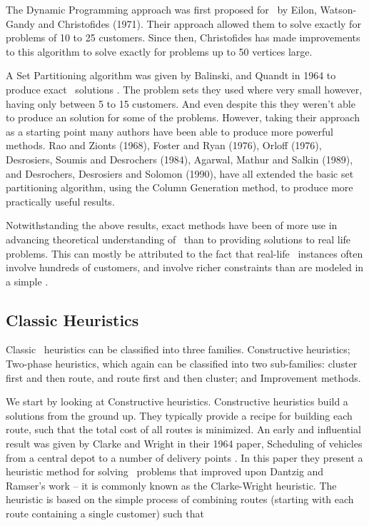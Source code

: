 The Dynamic Programming approach was first proposed for \VRP\ by Eilon, Watson-Gandy and Christofides (1971). Their approach allowed them to solve exactly for problems of 10 to 25 customers. Since then, Christofides has made improvements to this algorithm to solve exactly for problems up to 50 vertices large.

A Set Partitioning algorithm was given by Balinski, and Quandt in 1964 to produce exact \VRP\ solutions \cite{balinski:64}. The problem sets they used where very small however, having only between 5 to 15 customers. And even despite this they weren't able to produce an solution for some of the problems. However, taking their approach as a starting point many authors have been able to produce more powerful methods. Rao and Zionts (1968), Foster and Ryan (1976), Orloff (1976), Desrosiers, Soumis and Desrochers (1984), Agarwal, Mathur and Salkin (1989), and Desrochers, Desrosiers and Solomon (1990), have all extended the basic set partitioning algorithm, using the Column Generation method, to produce more practically useful results. 

Notwithstanding the above results, exact methods have been of more use in advancing theoretical understanding of \VRP\ than to providing solutions to real life problems. This can mostly be attributed to the fact that real-life \VRP\ instances often involve hundreds of customers, and involve richer constraints than are modeled in a simple \VRP.

\subsection{Classic Heuristics}
Classic \VRP\ heuristics can be classified into three families. Constructive heuristics; Two-phase heuristics, which again can be classified into two sub-families: cluster first and then route, and route first and then cluster; and Improvement methods.

We start by looking at Constructive heuristics. Constructive heuristics build a solutions from the ground up. They typically provide a recipe for building each route, such that the total cost of all routes is minimized. An early and influential result was given by Clarke and Wright in their 1964 paper, Scheduling of vehicles from a central depot to a number of delivery points \cite{clark:1964}. In this paper they present a heuristic method for solving \VRP\ problems that improved upon Dantzig and Ramser's work -- it is commonly known as the Clarke-Wright heuristic. The heuristic is based on the simple process of combining routes (starting with each route containing a single customer) such that 

